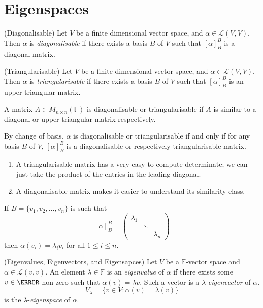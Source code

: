 \documentclass{article}
\newcommand{\F}{\mathbb{F}}
\begin{document}
\section{Eigenspaces}
\begin{definition}
	(Diagonalisable) Let $ V $ be a finite dimensional vector space, and $ \alpha\in\mathcal L(V,V) $. Then $ \alpha $ is \textit{diagonalisable} if there exists a basis $ B $ of $ V $ such that $ [\alpha]^B_B $ is a diagonal matrix.
\end{definition}
\begin{definition}
	(Triangularisable) Let $ V $ be a finite dimensional vector space, and $ \alpha\in\mathcal L(V,V) $. Then $ \alpha $ is \textit{triangularisable} if there exists a basis $ B $ of $ V $ such that $ [\alpha]^B_B $ is an upper-triangular matrix.
\end{definition}
A matrix $ A\in M_{n\times n}(\F) $ is diagonalisable or triangularisable if $ A $ is similar to a diagonal or upper triangular matrix respectively.
\begin{remark}
	By change of basis, $ \alpha $ is diagonalisable or triangularisable if and only if for any basis $ B $ of $ V $, $ [\alpha]^B_B $ is a diagonalisable or respectively triangularisable matrix.
\end{remark}
\begin{enumerate}
	\item A triangularisable matrix has a very easy to compute determinate; we can just take the product of the entries in the leading diagonal.
	\item A diagonalisable matrix makes it easier to understand its similarity class.
\end{enumerate}
\begin{remark}
	If $ B=\{v_1,v_2,\dots, v_n\} $ is such that
	\[
		[\alpha]_B^B=\begin{pmatrix}
			\lambda_1 & & \\
				  & \ddots & \\
				  & & \lambda_n
		\end{pmatrix}
	\]
	then $ \alpha(v_i)=\lambda_iv_i $ for all $ 1\le i\le n $.
\end{remark}
\begin{definition}
	(Eigenvalues, Eigenvectors, and Eigensapces) Let $ V $ be a $ \F $-vector space and $ \alpha\in\mathcal L(v,v) $. An element $ \lambda\in \F $ is an \textit{eigenvalue} of $ \alpha $ if there exists some $ v\in\V $ non-zero such that $ \alpha(v)=\lambda v $. Such a vector is a $ \lambda $-\textit{eigenvector} of $ \alpha $.
	\[
		V_\lambda=\{v\in V:\alpha(v)=\lambda (v)\}
	\]
	is the $ \lambda $-\textit{eigenspace} of $ \alpha $.
\end{definition}
\end{document}
